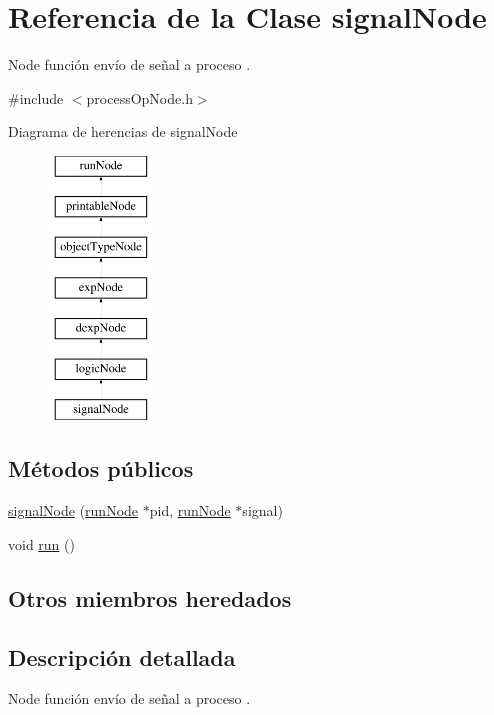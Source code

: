 \hypertarget{classsignalNode}{\section{Referencia de la Clase signal\-Node}
\label{classsignalNode}
}


Node función envío de señal a proceso .  




{\ttfamily \#include $<$process\-Op\-Node.\-h$>$}

Diagrama de herencias de signal\-Node\begin{figure}[H]
\begin{center}
\leavevmode
\includegraphics[height=7.000000cm]{classsignalNode}
\end{center}
\end{figure}
\subsection*{Métodos públicos}
\begin{DoxyCompactItemize}
\item 
\hyperlink{classsignalNode_a194dc5f746e28aed6c37db7694f65b4c}{signal\-Node} (\hyperlink{classrunNode}{run\-Node} $\ast$pid, \hyperlink{classrunNode}{run\-Node} $\ast$signal)
\item 
void \hyperlink{classsignalNode_ab7301aabdfecb2e2fcdcd4e787c7476d}{run} ()
\end{DoxyCompactItemize}
\subsection*{Otros miembros heredados}


\subsection{Descripción detallada}
Node función envío de señal a proceso . 

